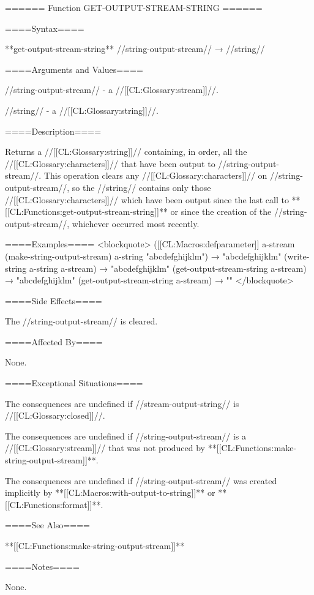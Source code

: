====== Function GET-OUTPUT-STREAM-STRING ======

====Syntax====

**get-output-stream-string** //string-output-stream// → //string//

====Arguments and Values====

//string-output-stream// - a //[[CL:Glossary:stream]]//.

//string// - a //[[CL:Glossary:string]]//.

====Description====

Returns a //[[CL:Glossary:string]]// containing, in order, all the //[[CL:Glossary:characters]]// that have been output to //string-output-stream//. This operation clears any //[[CL:Glossary:characters]]// on //string-output-stream//, so the //string// contains only those //[[CL:Glossary:characters]]// which have been output since the last call to **[[CL:Functions:get-output-stream-string]]** or since the creation of the //string-output-stream//, whichever occurred most recently.

====Examples==== <blockquote> ([[CL:Macros:defparameter]] a-stream (make-string-output-stream) a-string "abcdefghijklm") → "abcdefghijklm" (write-string a-string a-stream) → "abcdefghijklm" (get-output-stream-string a-stream) → "abcdefghijklm" (get-output-stream-string a-stream) → "" </blockquote>

====Side Effects====

The //string-output-stream// is cleared.

====Affected By====

None.

====Exceptional Situations====

The consequences are undefined if //stream-output-string// is //[[CL:Glossary:closed]]//.

The consequences are undefined if //string-output-stream// is a //[[CL:Glossary:stream]]// that was not produced by **[[CL:Functions:make-string-output-stream]]**.

The consequences are undefined if //string-output-stream// was created implicitly by **[[CL:Macros:with-output-to-string]]** or **[[CL:Functions:format]]**.

====See Also====

**[[CL:Functions:make-string-output-stream]]**

====Notes====

None.

 
